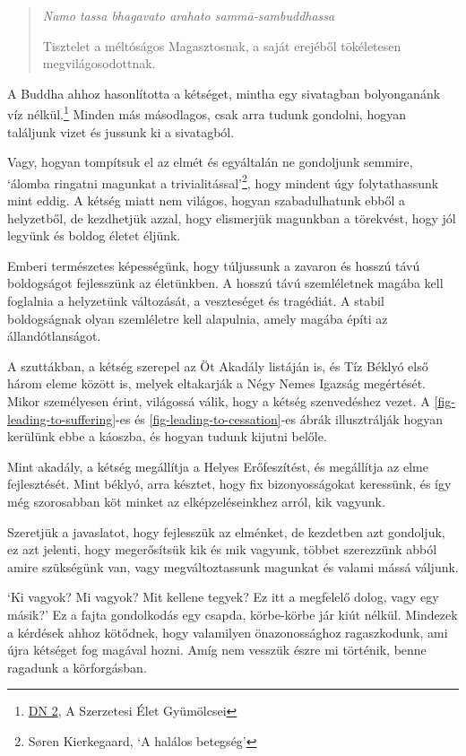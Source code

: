 \begin{quote}
\emph{Namo tassa bhagavato arahato sammā-sambuddhassa}

Tisztelet a méltóságos Magasztosnak, a saját erejéből tökéletesen
megvilágosodottnak.
\end{quote}


A Buddha ahhoz hasonlította a kétséget, mintha egy sivatagban
bolyonganánk víz nélkül.\footnote{\href{https://suttacentral.net/dn2}{DN
  2}, A Szerzetesi Élet Gyümölcsei} Minden más másodlagos, csak arra
tudunk gondolni, hogyan találjunk vizet és jussunk ki a sivatagból.

Vagy, hogyan tompítsuk el az elmét és egyáltalán ne gondoljunk semmire,
`álomba ringatni magunkat a trivialitással'\footnote{Søren Kierkegaard,
  `A halálos betegség'}, hogy mindent úgy folytathassunk mint eddig. A
kétség miatt nem világos, hogyan szabadulhatunk ebből a helyzetből, de
kezdhetjük azzal, hogy elismerjük magunkban a törekvést, hogy jól
legyünk és boldog életet éljünk.

Emberi természetes képességünk, hogy túljussunk a zavaron és hosszú távú
boldogságot fejlesszünk az életünkben. A hosszú távú szemléletnek magába
kell foglalnia a helyzetünk változását, a veszteséget és tragédiát. A
stabil boldogságnak olyan szemléletre kell alapulnia, amely magába építi
az állandótlanságot.

A szuttákban, a kétség szerepel az Öt Akadály listáján is, és Tíz Béklyó
első három eleme között is, melyek eltakarják a Négy Nemes Igazság
megértését. Mikor személyesen érint, világossá válik, hogy a kétség
szenvedéshez vezet. A \ref{fig-leading-to-suffering}-es és
\ref{fig-leading-to-cessation}-es ábrák illusztrálják hogyan kerülünk
ebbe a káoszba, és hogyan tudunk kijutni belőle.

Mint akadály, a kétség megállítja a Helyes Erőfeszítést, és megállítja
az elme fejlesztését. Mint béklyó, arra késztet, hogy fix
bizonyosságokat keressünk, és így még szorosabban köt minket az
elképzeléseinkhez arról, kik vagyunk.

Szeretjük a javaslatot, hogy fejlesszük az elménket, de kezdetben azt
gondoljuk, ez azt jelenti, hogy megerősítsük kik és mik vagyunk, többet
szerezzünk abból amire szükségünk van, vagy megváltoztassunk magunkat és
valami mássá váljunk.

`Ki vagyok? Mi vagyok? Mit kellene tegyek? Ez itt a megfelelő dolog,
vagy egy másik?' Ez a fajta gondolkodás egy csapda, körbe-körbe jár kiút
nélkül. Mindezek a kérdések ahhoz kötődnek, hogy valamilyen
önazonossághoz ragaszkodunk, ami újra kétséget fog magával hozni. Amíg
nem vesszük észre mi történik, benne ragadunk a körforgásban.

